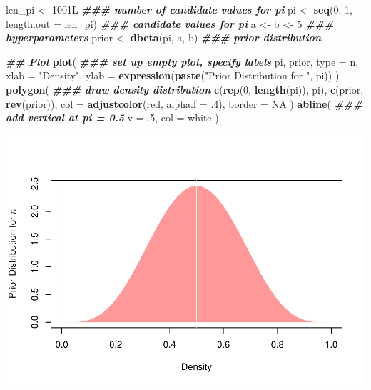\documentclass[
  11pt,
]{article}
\newenvironment{Shaded}{\begin{snugshade}}{\end{snugshade}}
\newcommand{\AttributeTok}[1]{\textcolor[rgb]{0.13,0.29,0.53}{#1}}
\newcommand{\ConstantTok}[1]{\textcolor[rgb]{0.56,0.35,0.01}{#1}}
\newcommand{\DecValTok}[1]{\textcolor[rgb]{0.00,0.00,0.81}{#1}}
\newcommand{\DocumentationTok}[1]{\textcolor[rgb]{0.56,0.35,0.01}{\textbf{\textit{#1}}}}
\newcommand{\FunctionTok}[1]{\textcolor[rgb]{0.13,0.29,0.53}{\textbf{#1}}}
\newcommand{\NormalTok}[1]{#1}
\newcommand{\OtherTok}[1]{\textcolor[rgb]{0.56,0.35,0.01}{#1}}
\newcommand{\StringTok}[1]{\textcolor[rgb]{0.31,0.60,0.02}{#1}}
\begin{document}
\begin{Shaded}
\begin{Highlighting}[]
\NormalTok{len\_pi }\OtherTok{\textless{}{-}}\NormalTok{ 1001L                      }\DocumentationTok{\#\#\# number of candidate values for pi}
\NormalTok{pi }\OtherTok{\textless{}{-}} \FunctionTok{seq}\NormalTok{(}\DecValTok{0}\NormalTok{, }\DecValTok{1}\NormalTok{, }\AttributeTok{length.out =}\NormalTok{ len\_pi) }\DocumentationTok{\#\#\# candidate values for pi}
\NormalTok{a }\OtherTok{\textless{}{-}}\NormalTok{ b }\OtherTok{\textless{}{-}} \DecValTok{5}                          \DocumentationTok{\#\#\# hyperparameters}
\NormalTok{prior }\OtherTok{\textless{}{-}} \FunctionTok{dbeta}\NormalTok{(pi, a, b)             }\DocumentationTok{\#\#\# prior distribution}

\DocumentationTok{\#\# Plot}
\FunctionTok{plot}\NormalTok{(                                }\DocumentationTok{\#\#\# set up empty plot, specify labels}
\NormalTok{  pi, prior,}
  \AttributeTok{type =} \StringTok{\textquotesingle{}n\textquotesingle{}}\NormalTok{,}
  \AttributeTok{xlab =} \StringTok{"Density"}\NormalTok{,}
  \AttributeTok{ylab =} \FunctionTok{expression}\NormalTok{(}\FunctionTok{paste}\NormalTok{(}\StringTok{"Prior Distribution for "}\NormalTok{, pi))}
\NormalTok{)}
\FunctionTok{polygon}\NormalTok{(                             }\DocumentationTok{\#\#\# draw density distribution}
  \FunctionTok{c}\NormalTok{(}\FunctionTok{rep}\NormalTok{(}\DecValTok{0}\NormalTok{, }\FunctionTok{length}\NormalTok{(pi)), pi),}
  \FunctionTok{c}\NormalTok{(prior, }\FunctionTok{rev}\NormalTok{(prior)),}
  \AttributeTok{col =} \FunctionTok{adjustcolor}\NormalTok{(}\StringTok{\textquotesingle{}red\textquotesingle{}}\NormalTok{, }\AttributeTok{alpha.f =}\NormalTok{ .}\DecValTok{4}\NormalTok{),}
  \AttributeTok{border =} \ConstantTok{NA}
\NormalTok{)}
\FunctionTok{abline}\NormalTok{(                              }\DocumentationTok{\#\#\# add vertical at pi = 0.5 }
  \AttributeTok{v =}\NormalTok{ .}\DecValTok{5}\NormalTok{,}
  \AttributeTok{col =} \StringTok{\textquotesingle{}white\textquotesingle{}}
\NormalTok{)}
\end{Highlighting}
\end{Shaded}

\begin{center}\includegraphics[width=0.75\linewidth]{01-02-lec_files/figure-latex/coin-sim0-print-1} \end{center}
\end{document}
